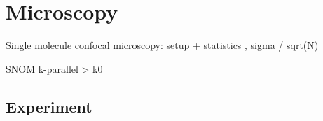 

\chapter{Microscopy}




Single molecule confocal microscopy: setup + statistics , sigma / sqrt(N)

SNOM k-parallel > k0




\section{Experiment}






\printbibliography[segment=\therefsegment,heading=subbibliography]
